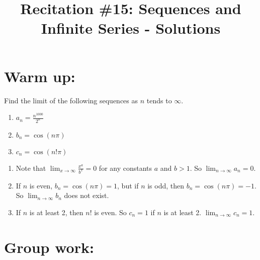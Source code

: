 \documentclass[noinstructornotes]{ximera}
\title{Recitation \#15: Sequences and Infinite Series - Solutions}
\begin{document}
\begin{abstract}		\end{abstract}
\maketitle



\section{Warm up:}
Find the limit of the following sequences as $n$ tends to $\infty$. 
\begin{enumerate}

\item $a_n = \frac{n^{1000}}{2^n}$

	
\item $b_n = \cos (n \pi)$

\item $c_n = \cos (n! \pi)$

\end{enumerate}
	\begin{freeResponse}
\begin{enumerate}	
\item Note that $\lim_{x \to \infty} \frac{x^a}{b^x} = 0$ for any constants $a$ and $b>1$. So $\lim_{n \to \infty} a_n =0$.
\item If $n$ is even, $b_n = \cos(n \pi) = 1$, but if $n$ is odd, then $b_n = \cos(n \pi) = -1$. So $\lim_{n \to \infty} b_n$ does not exist.
\item If $n$ is at least 2, then $n!$ is even. So $c_n = 1$ if $n$ is at least 2. $\lim_{n \to \infty} c_n = 1$. 
\end{enumerate}
	\end{freeResponse}
\begin{instructorNotes}

\end{instructorNotes}







\section{Group work:}
\end{document}
